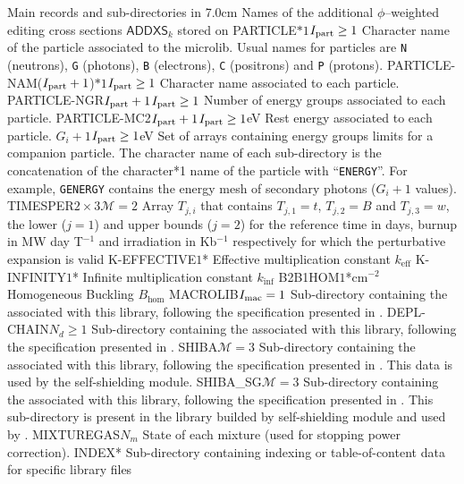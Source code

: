 \begin{DescriptionEnregistrement}{Main records and sub-directories in }{7.0cm}
  {Names of the additional $\phi$--weighted editing cross sections $\mathsf{ADDXS}_{k}$ stored on }
\OptCharEnr
  {PARTICLE}{$*1$}{$I_{\rm part}\ge 1$} 
  {Character name of the particle associated to the microlib. Usual names for
  particles are {\tt N} (neutrons), {\tt G} (photons), {\tt B} (electrons),
  {\tt C} (positrons) and {\tt P} (protons).}
\OptCharEnr
  {PARTICLE-NAM}{($I_{\rm part}+1$)$*1$}{$I_{\rm part}\ge 1$} 
  {Character name associated to each particle.}
\OptIntEnr
  {PARTICLE-NGR}{$I_{\rm part}+1$}{$I_{\rm part}\ge 1$}
  {Number of energy groups associated to each particle.}
\OptRealEnr
  {PARTICLE-MC2}{$I_{\rm part}+1$}{$I_{\rm part}\ge 1$}{eV}
  {Rest energy associated to each particle.}
\OptRealVar
  {}{$G_i+1$}{$I_{\rm part}\ge 1$}{eV}
  {Set of arrays containing energy groups limits for a companion particle. The character name
  of each sub-directory is the concatenation of the character*1 name of the particle with ``{\tt ENERGY}''.
  For example, {\tt GENERGY} contains the energy mesh of secondary photons ($G_i+1$ values).}
\OptRealEnr
  {TIMESPER}{$2\times 3$}{$\mathcal{M}=2$}{}
  {Array $T_{j,i}$ that contains $T_{j,1}=t$, $T_{j,2}=B$ and $T_{j,3}=w$, the
   lower ($j=1$) and upper bounds ($j=2$) for the reference time in days, burnup
   in MW day T$^{-1}$ and irradiation in Kb$^{-1}$ respectively for which the
   perturbative expansion is valid}
\OptRealEnr
  {K-EFFECTIVE}{$1$}{*}{}
  {Effective multiplication constant $k_{\mathrm{eff}}$}
\OptRealEnr
  {K-INFINITY}{$1$}{*}{}
  {Infinite multiplication constant $k_{\mathrm{inf}}$}
\OptRealEnr
  {B2B1HOM}{$1$}{*}{cm$^{-2}$~~}
  {Homogeneous Buckling $B_{\mathrm{hom}}$}
\OptDirEnr
  {MACROLIB}{$I_{\rm mac} = 1$}
  {Sub-directory containing the  associated with this
  library, following the specification presented in .}
\OptDirEnr
  {DEPL-CHAIN}{$N_{d} \ge 1$}
  {Sub-directory containing the  associated with this library, following
  the specification presented in .}
\OptDirEnr
  {SHIBA}{$\mathcal{M}=3$}
  {Sub-directory containing the  associated with this
  library, following the specification presented in .
  This data is used by the  self-shielding module.}
\OptDirEnr
  {SHIBA\_SG}{$\mathcal{M}=3$}
  {Sub-directory containing the  associated with this
  library, following the specification presented in .
  This sub-directory is present in the library builded by  self-shielding module and used by .}
\IntEnr
  {MIXTUREGAS}{$N_{m}$}
  {State of each mixture (used for stopping power correction).}
\OptDirEnr
  {INDEX}{*}
  {Sub-directory containing indexing or table-of-content data for specific library
  files}
\end{DescriptionEnregistrement}

